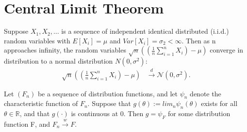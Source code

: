 \newpage

\section{Central Limit Theorem}
\begin{theorem}
  Suppose ${X_1, X_2, \dots}$ is a sequence of independent identical
  distributed (i.i.d.) random variables with $E[X_i] = \mu$ and
  $Var[X_i] = \sigma_2 < \infty$. Then as n approaches infinity, the
  random variables $\sqrt{n}((\frac{1}{n}\sum_{i=1}^{n}X_i) - \mu)$
  converge in distribution to a normal distribution $N(0,\sigma^2)$:
\begin{align}
\sqrt{n}((\frac{1}{n}\sum_{i=1}^{n}X_i) - \mu)&\stackrel{d}{\longrightarrow} \mathcal{N}(0,\sigma^2).
\end{align}
\end{theorem}

\begin{lemma}
Let $(F_n)$ be a sequence of distribution functions, and let $\psi_n$ denote the characteristic function of $F_n$. Suppose that $g(\theta):=lim_n \psi_n(\theta)$ exists for all $\theta \in \mathbb{R}$, and that $g(\cdot)$ is continuous at 0. Then $g=\psi_F$ for some distribution function F, and $F_n \stackrel{w}{\longrightarrow} F$.
\end{lemma}


